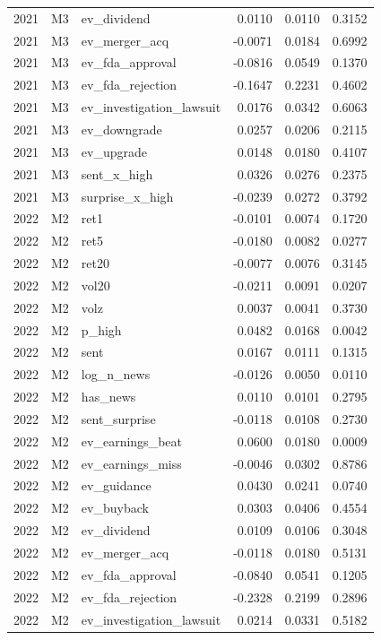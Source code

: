 \begin{tabular}{rllrrr}
2021 & M3 & ev\_dividend & 0.0110 & 0.0110 & 0.3152 \\
2021 & M3 & ev\_merger\_acq & -0.0071 & 0.0184 & 0.6992 \\
2021 & M3 & ev\_fda\_approval & -0.0816 & 0.0549 & 0.1370 \\
2021 & M3 & ev\_fda\_rejection & -0.1647 & 0.2231 & 0.4602 \\
2021 & M3 & ev\_investigation\_lawsuit & 0.0176 & 0.0342 & 0.6063 \\
2021 & M3 & ev\_downgrade & 0.0257 & 0.0206 & 0.2115 \\
2021 & M3 & ev\_upgrade & 0.0148 & 0.0180 & 0.4107 \\
2021 & M3 & sent\_x\_high & 0.0326 & 0.0276 & 0.2375 \\
2021 & M3 & surprise\_x\_high & -0.0239 & 0.0272 & 0.3792 \\
2022 & M2 & ret1 & -0.0101 & 0.0074 & 0.1720 \\
2022 & M2 & ret5 & -0.0180 & 0.0082 & 0.0277 \\
2022 & M2 & ret20 & -0.0077 & 0.0076 & 0.3145 \\
2022 & M2 & vol20 & -0.0211 & 0.0091 & 0.0207 \\
2022 & M2 & volz & 0.0037 & 0.0041 & 0.3730 \\
2022 & M2 & p\_high & 0.0482 & 0.0168 & 0.0042 \\
2022 & M2 & sent & 0.0167 & 0.0111 & 0.1315 \\
2022 & M2 & log\_n\_news & -0.0126 & 0.0050 & 0.0110 \\
2022 & M2 & has\_news & 0.0110 & 0.0101 & 0.2795 \\
2022 & M2 & sent\_surprise & -0.0118 & 0.0108 & 0.2730 \\
2022 & M2 & ev\_earnings\_beat & 0.0600 & 0.0180 & 0.0009 \\
2022 & M2 & ev\_earnings\_miss & -0.0046 & 0.0302 & 0.8786 \\
2022 & M2 & ev\_guidance & 0.0430 & 0.0241 & 0.0740 \\
2022 & M2 & ev\_buyback & 0.0303 & 0.0406 & 0.4554 \\
2022 & M2 & ev\_dividend & 0.0109 & 0.0106 & 0.3048 \\
2022 & M2 & ev\_merger\_acq & -0.0118 & 0.0180 & 0.5131 \\
2022 & M2 & ev\_fda\_approval & -0.0840 & 0.0541 & 0.1205 \\
2022 & M2 & ev\_fda\_rejection & -0.2328 & 0.2199 & 0.2896 \\
2022 & M2 & ev\_investigation\_lawsuit & 0.0214 & 0.0331 & 0.5182 \\

\end{tabular}

